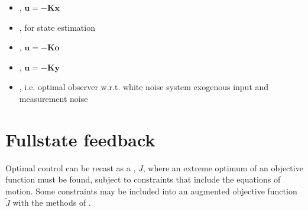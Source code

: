 \documentclass[letterpaper,10pt,english]{jupyterBook}
\begin{document}
\sphinxAtStartPar
{}
\begin{itemize}
\item {} 
\sphinxAtStartPar
{\hyperref[\detokenize{ch/control/optimal-control-full-state:control-optimal-full-state-fb}]{}}, \(\mathbf{u} = - \mathbf{K} \mathbf{x}\)

\item {} 
\sphinxAtStartPar
{}, for state estimation

\item {} 
\sphinxAtStartPar
{\hyperref[\detokenize{ch/control/optimal-control-regulator-observer:control-controller-observer}]{}}, \(\mathbf{u} = - \mathbf{K} \mathbf{o}\)

\item {} 
\sphinxAtStartPar
{\hyperref[\detokenize{ch/control/optimal-control-output:control-optimal-output-fb}]{}}, \(\mathbf{u} = - \mathbf{K} \mathbf{y}\)

\end{itemize}

\sphinxAtStartPar
{}
\begin{itemize}
\item {} 
\sphinxAtStartPar
{\hyperref[\detokenize{ch/control/kalman:control-kalman}]{}}, i.e. optimal observer w.r.t. white noise system exogenous input and measurement noise

\end{itemize}

\sphinxstepscope


\section{Full\sphinxhyphen{}state feedback}
\label{\detokenize{ch/control/optimal-control-full-state:full-state-feedback}}\label{\detokenize{ch/control/optimal-control-full-state:control-optimal-full-state-fb}}\label{\detokenize{ch/control/optimal-control-full-state::doc}}
\sphinxAtStartPar
Optimal control can be recast as a , \(J\), where an extreme \sphinxhyphen{} optimum \sphinxhyphen{} of an objective function must be found, subject to constraints that include the equations of motion. Some constraints may be included into an augmented objective function \(\widetilde{J}\) with the methods of {\hyperref[\detokenize{ch/optimization/intro:optimization-constrained-lagrange-multipliers}]{}}.
\end{document}

